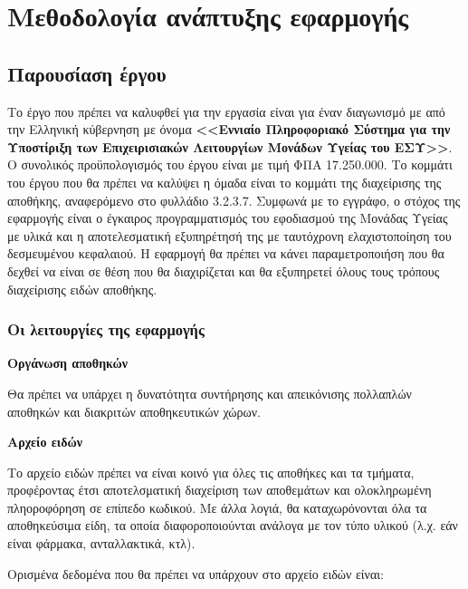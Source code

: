 \label{Chapter1}

\section{Μεθοδολογία ανάπτυξης εφαρμογής}

\subsection{Παρουσίαση έργου}

Το έργο που πρέπει να καλυφθεί για την εργασία είναι για έναν διαγωνισμό με από την Ελληνική κύβερνηση με όνομα \textbf{<<Εννιαίο Πληροφοριακό Σύστημα για την Υποστίριξη των Επιχειρισιακών Λειτουργίων Μονάδων Υγείας του ΕΣΥ>>}.
O συνολικός προϋπολογισμός του έργου είναι με τιμή ΦΠΑ 17.250.000\texteuro.
Το κομμάτι του έργου που θα πρέπει να καλύψει η όμαδα είναι το κομμάτι της διαχείρισης της αποθήκης, αναφερόμενο στο φυλλάδιο 3.2.3.7.
Συμφωνά με το εγγράφο, ο στόχος της εφαρμογής είναι ο έγκαιρος προγραμματισμός του εφοδιασμού της Μονάδας Υγείας με υλικά και η αποτελεσματική εξυπηρέτησή της με ταυτόχρονη ελαχιστοποίηση του δεσμευμένου κεφαλαιού.
Η εφαρμογή θα πρέπει να κάνει παραμετροποιήση που θα δεχθεί να είναι σε θέση που θα διαχιρίζεται και θα εξυπηρετεί όλους τους τρόπους διαχείρισης ειδών αποθήκης.

\subsubsection{Οι λειτουργίες της εφαρμογής}

\begin{problem}
    \textbf{Οργάνωση αποθηκών}
\end{problem}

Θα πρέπει να υπάρχει η δυνατότητα συντήρησης και απεικόνισης πολλαπλών αποθηκών και διακριτών αποθηκευτικών χώρων.

\begin{problem}
    \textbf{Αρχείο ειδών}
\end{problem}

Το αρχείο ειδών πρέπει να είναι κοινό για όλες τις αποθήκες και τα τμήματα, προφέροντας έτσι αποτελσματική διαχείριση των αποθεμάτων και ολοκληρωμένη πληοροφόρηση σε επίπεδο κωδικού.
Με άλλα λογιά, θα καταχωρόνονται όλα τα αποθηκεύσιμα είδη, τα οποία διαφοροποιούνται ανάλογα με τον τύπο υλικού (λ.χ. εάν είναι φάρμακα, ανταλλακτικά, κτλ). \par
Ορισμένα δεδομένα που θα πρέπει να υπάρχουν στο αρχείο ειδών είναι: 

